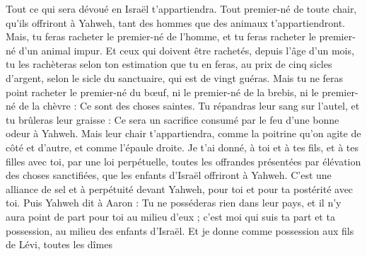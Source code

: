 \begin{multicols}{2}
Tout ce qui sera dévoué en Israël t'appartiendra.
Tout premier-né de toute chair, qu'ils offriront à Yahweh, tant des hommes que des animaux t'appartiendront. Mais, tu feras racheter le premier-né de l'homme, et tu feras racheter le premier-né d'un animal impur.
Et ceux qui doivent être rachetés, depuis l’âge d’un mois, tu les rachèteras selon ton estimation que tu en feras, au prix de cinq sicles d'argent, selon le sicle du sanctuaire, qui est de vingt guéras.
Mais tu ne feras point racheter le premier-né du bœuf, ni le premier-né de la brebis, ni le premier-né de la chèvre : Ce sont des choses saintes. Tu répandras leur sang sur l'autel, et tu brûleras leur graisse : Ce sera un sacrifice consumé par le feu d'une bonne odeur à Yahweh.
Mais leur chair t'appartiendra, comme la poitrine qu'on agite de côté et d'autre, et comme l'épaule droite.
Je t'ai donné, à toi et à tes fils, et à tes filles avec toi, par une loi perpétuelle, toutes les offrandes présentées par élévation des choses sanctifiées, que les enfants d'Israël offriront à Yahweh. C'est une alliance de sel et à perpétuité devant Yahweh, pour toi et pour ta postérité avec toi.
Puis Yahweh dit à Aaron : Tu ne posséderas rien dans leur pays, et il n'y aura point de part pour toi au milieu d'eux ; c'est moi qui suis ta part et ta possession, au milieu des enfants d'Israël.
Et je donne comme possession aux fils de Lévi, toutes les dîmes
\end{multicols}
